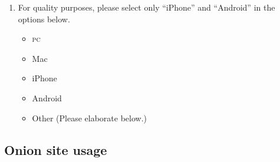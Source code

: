 \begin{enumerate}
    \item For quality purposes, please select only ``iPhone'' and ``Android''
        in the options below.
        \begin{itemize}[label=$\Square$]
            \item \textsc{pc}
            \item Mac
            \item iPhone
            \item Android
            \item Other (Please elaborate below.)
        \end{itemize}
\end{enumerate}

\subsection{Onion site usage}

